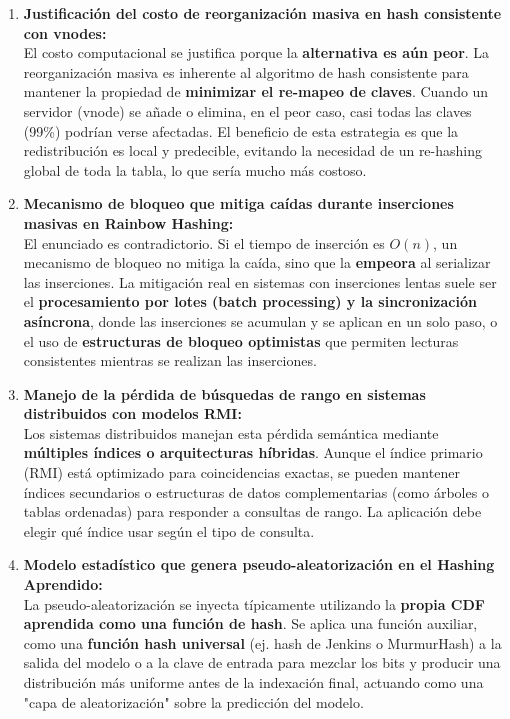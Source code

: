 \documentclass[12pt,a4paper]{report}
\begin{document}
\begin{enumerate}
    \item \textbf{Justificación del costo de reorganización masiva en hash consistente con vnodes:}\\
    El costo computacional se justifica porque la \textbf{alternativa es aún peor}. La reorganización masiva es inherente al algoritmo de hash consistente para mantener la propiedad de \textbf{minimizar el re-mapeo de claves}. Cuando un servidor (vnode) se añade o elimina, en el peor caso, casi todas las claves (99\%) podrían verse afectadas. El beneficio de esta estrategia es que la redistribución es local y predecible, evitando la necesidad de un re-hashing global de toda la tabla, lo que sería mucho más costoso.
    \item \textbf{Mecanismo de bloqueo que mitiga caídas durante inserciones masivas en Rainbow Hashing:}\\
    El enunciado es contradictorio. Si el tiempo de inserción es $O(n)$, un mecanismo de bloqueo no mitiga la caída, sino que la \textbf{empeora} al serializar las inserciones. La mitigación real en sistemas con inserciones lentas suele ser el \textbf{procesamiento por lotes (batch processing) y la sincronización asíncrona}, donde las inserciones se acumulan y se aplican en un solo paso, o el uso de \textbf{estructuras de bloqueo optimistas} que permiten lecturas consistentes mientras se realizan las inserciones.
    \item \textbf{Manejo de la pérdida de búsquedas de rango en sistemas distribuidos con modelos RMI:}\\
    Los sistemas distribuidos manejan esta pérdida semántica mediante \textbf{múltiples índices o arquitecturas híbridas}. Aunque el índice primario (RMI) está optimizado para coincidencias exactas, se pueden mantener índices secundarios o estructuras de datos complementarias (como árboles o tablas ordenadas) para responder a consultas de rango. La aplicación debe elegir qué índice usar según el tipo de consulta.
    \item \textbf{Modelo estadístico que genera pseudo-aleatorización en el Hashing Aprendido:}\\
    La pseudo-aleatorización se inyecta típicamente utilizando la \textbf{propia CDF aprendida como una función de hash}. Se aplica una función auxiliar, como una \textbf{función hash universal} (ej. hash de Jenkins o MurmurHash) a la salida del modelo o a la clave de entrada para mezclar los bits y producir una distribución más uniforme antes de la indexación final, actuando como una "capa de aleatorización" sobre la predicción del modelo.

\end{enumerate}
\end{document}
